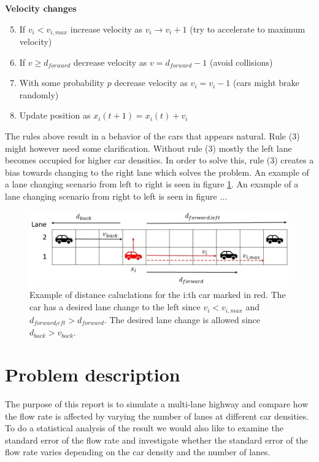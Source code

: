 \documentclass[a4paper,12pt]{article}
\begin{document}
\textbf{Velocity changes}
\begin{enumerate}
    \setcounter{enumi}{4}
    \item If $v_i<v_{i, max}$ increase velocity as $v_i \rightarrow v_i+1$ (try to accelerate to maximum velocity)
    \item If $v \geq d_{forward}$ decrease velocity as $v = d_{forward} - 1$ (avoid collisions)
    \item With some probability $p$ decrease velocity as $v_i=v_i-1$ (cars might brake randomly)
    \item Update position as $x_i(t+1) = x_i(t) + v_i$
\end{enumerate}

The rules above result in a behavior of the cars that appears natural. Rule (3) might however need some
clarification. Without rule (3) mostly the left lane becomes occupied for higher car densities. In order to solve this, rule (3) creates
a bias towards changing to the right lane which solves the problem. An example of a lane changing scenario from left to right is seen in figure
\ref*{left to right}. An example of a lane changing scenario from right to left is seen in figure ... %

\begin{figure}[H]
    \centering
    \includegraphics[scale=0.6]{Images/Bilbild.jpg}
    \caption{Example of distance caluclations for the i:th car marked in red. The car has a desired
    lane change to the left since $v_i < v_{i, max}$ and $d_{forward_left}>d_{forward}$. The desired lane change
    is allowed since $d_{back} > v_{back}$.}
    \label{left to right}
\end{figure}


\section*{Problem description}
The purpose of this report is to simulate a multi-lane highway and compare how the flow rate is affected by varying the number
of lanes at different car densities.
To do a statistical analysis of the result we would also like to examine the standard error of the flow rate and investigate whether the 
standard error of the flow rate varies depending on the car density and the number of lanes.
\end{document}

